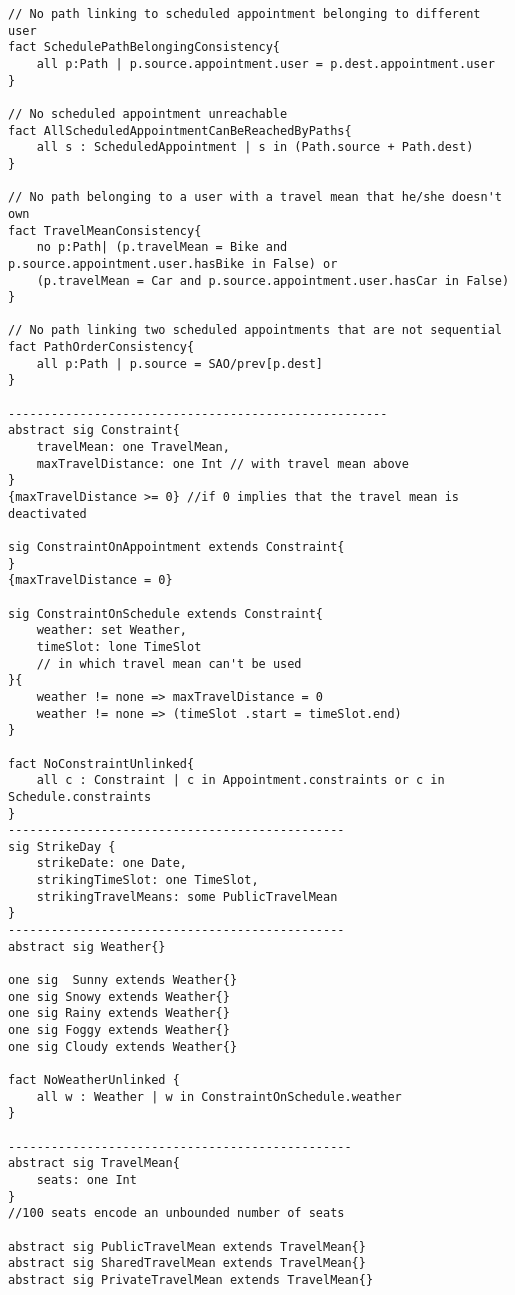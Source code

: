 \begin{lstlisting}
// No path linking to scheduled appointment belonging to different user
fact SchedulePathBelongingConsistency{ 
	all p:Path | p.source.appointment.user = p.dest.appointment.user
}

// No scheduled appointment unreachable
fact AllScheduledAppointmentCanBeReachedByPaths{
	all s : ScheduledAppointment | s in (Path.source + Path.dest)
}

// No path belonging to a user with a travel mean that he/she doesn't own
fact TravelMeanConsistency{
	no p:Path| (p.travelMean = Bike and p.source.appointment.user.hasBike in False) or 
	(p.travelMean = Car and p.source.appointment.user.hasCar in False) 
}

// No path linking two scheduled appointments that are not sequential
fact PathOrderConsistency{
	all p:Path | p.source = SAO/prev[p.dest] 
} 

-----------------------------------------------------
abstract sig Constraint{
	travelMean: one TravelMean,
	maxTravelDistance: one Int // with travel mean above
}
{maxTravelDistance >= 0} //if 0 implies that the travel mean is deactivated

sig ConstraintOnAppointment extends Constraint{
}
{maxTravelDistance = 0}

sig ConstraintOnSchedule extends Constraint{
	weather: set Weather, 
	timeSlot: lone TimeSlot
	// in which travel mean can't be used
}{
	weather != none => maxTravelDistance = 0
	weather != none => (timeSlot .start = timeSlot.end)
}

fact NoConstraintUnlinked{
	all c : Constraint | c in Appointment.constraints or c in Schedule.constraints
}
-----------------------------------------------
sig StrikeDay {
	strikeDate: one Date,
	strikingTimeSlot: one TimeSlot,
	strikingTravelMeans: some PublicTravelMean
}
-----------------------------------------------
abstract sig Weather{} 

one sig  Sunny extends Weather{}
one sig Snowy extends Weather{}
one sig Rainy extends Weather{}
one sig Foggy extends Weather{}
one sig Cloudy extends Weather{}

fact NoWeatherUnlinked {
	all w : Weather | w in ConstraintOnSchedule.weather 
}

------------------------------------------------
abstract sig TravelMean{ 
	seats: one Int
}
//100 seats encode an unbounded number of seats

abstract sig PublicTravelMean extends TravelMean{}
abstract sig SharedTravelMean extends TravelMean{}
abstract sig PrivateTravelMean extends TravelMean{}


\end{lstlisting}
